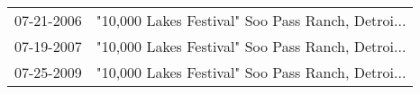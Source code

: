 \begin{supertabular}{ll}
 07-21-2006 &  "10,000 Lakes Festival" Soo Pass Ranch, Detroi... \\
 07-19-2007 &  "10,000 Lakes Festival" Soo Pass Ranch, Detroi... \\
 07-25-2009 &  "10,000 Lakes Festival" Soo Pass Ranch, Detroi... \\
\end{supertabular}
